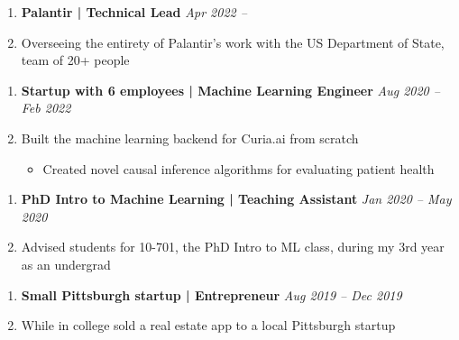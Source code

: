 \documentclass[letterpaper,11pt]{article}
\newcommand{\resitem}[1]{\item #1 \vspace{-2pt}}
\begin{document}
\begin{enumerate}[leftmargin=10pt]
	\item[] \textbf{\Large Palantir | \textcolor{myBlue}{Technical Lead}}  \cftdotfill{\cftdotsep} \large \textit{\textcolor{myBlue}{Apr 2022 --}}\\
	\item[] \large Overseeing the entirety of Palantir's work with the US Department of State, team of 20+ people
\end{enumerate}

\begin{enumerate}[leftmargin=10pt]
	\item[] \textbf{\Large Startup with 6 employees | \textcolor{myBlue}{Machine Learning Engineer}}  \cftdotfill{\cftdotsep} \large \textit{\textcolor{myBlue}{Aug 2020 --} Feb 2022}\\
	\item[] \large Built the machine learning backend for Curia.ai from scratch
	\begin{itemize}
		\resitem{Created novel causal inference algorithms for evaluating patient health}
	\end{itemize}
\end{enumerate}

\begin{enumerate}[leftmargin=10pt]
	\item[] \textbf{\Large PhD Intro to Machine Learning | \textcolor{myBlue}{Teaching Assistant}}  \cftdotfill{\cftdotsep} \large \textit{\textcolor{myBlue}{Jan 2020 --} May 2020}\\
	\item[] \large Advised students for 10-701, the PhD Intro to ML class, during my 3rd year as an undergrad
\end{enumerate}

\begin{enumerate}[leftmargin=10pt]
	\item[] \textbf{\Large Small Pittsburgh startup | \textcolor{myBlue}{Entrepreneur}}  \cftdotfill{\cftdotsep} \large \textit{\textcolor{myBlue}{Aug 2019 --} Dec 2019}\\
	\item[] \large While in college sold a real estate app to a local Pittsburgh startup
\end{enumerate}
\end{document}
